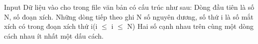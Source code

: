 Input
Dữ liệu vào cho trong file văn bản có cấu trúc như sau:  Dòng đầu tiên là số N, số đoạn xích.  Những dòng tiếp theo ghi N số nguyên dương, số thứ i là số mắt xích có trong đoạn xích thứ i(i  $\le$  i  $\le$  N)  Hai số cạnh nhau trên cùng một dòng cách nhau ít nhất một dấu cách.
